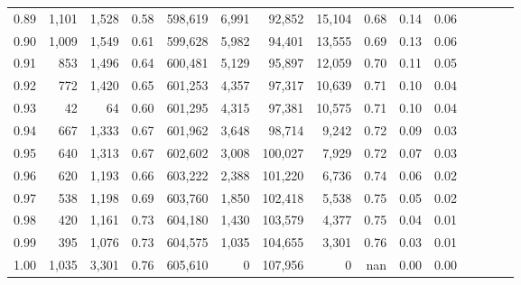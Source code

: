 \begin{tabular}{rrrcrrrrrrrrrrr}
0.89 &   1,101 &  1,528 &                                       0.58 &  598,619 &    6,991 &   92,852 &   15,104 &  0.68 &  0.14 &                         0.06 \\
0.90 &   1,009 &  1,549 &                                       0.61 &  599,628 &    5,982 &   94,401 &   13,555 &  0.69 &  0.13 &                         0.06 \\
0.91 &     853 &  1,496 &                                       0.64 &  600,481 &    5,129 &   95,897 &   12,059 &  0.70 &  0.11 &                         0.05 \\
0.92 &     772 &  1,420 &                                       0.65 &  601,253 &    4,357 &   97,317 &   10,639 &  0.71 &  0.10 &                         0.04 \\
0.93 &      42 &     64 &                                       0.60 &  601,295 &    4,315 &   97,381 &   10,575 &  0.71 &  0.10 &                         0.04 \\
0.94 &     667 &  1,333 &                                       0.67 &  601,962 &    3,648 &   98,714 &    9,242 &  0.72 &  0.09 &                         0.03 \\
0.95 &     640 &  1,313 &                                       0.67 &  602,602 &    3,008 &  100,027 &    7,929 &  0.72 &  0.07 &                         0.03 \\
0.96 &     620 &  1,193 &                                       0.66 &  603,222 &    2,388 &  101,220 &    6,736 &  0.74 &  0.06 &                         0.02 \\
0.97 &     538 &  1,198 &                                       0.69 &  603,760 &    1,850 &  102,418 &    5,538 &  0.75 &  0.05 &                         0.02 \\
0.98 &     420 &  1,161 &                                       0.73 &  604,180 &    1,430 &  103,579 &    4,377 &  0.75 &  0.04 &                         0.01 \\
0.99 &     395 &  1,076 &                                       0.73 &  604,575 &    1,035 &  104,655 &    3,301 &  0.76 &  0.03 &                         0.01 \\
1.00 &   1,035 &  3,301 &                                       0.76 &  605,610 &        0 &  107,956 &        0 &   nan &  0.00 &                         0.00 \\
\bottomrule
\end{tabular}
